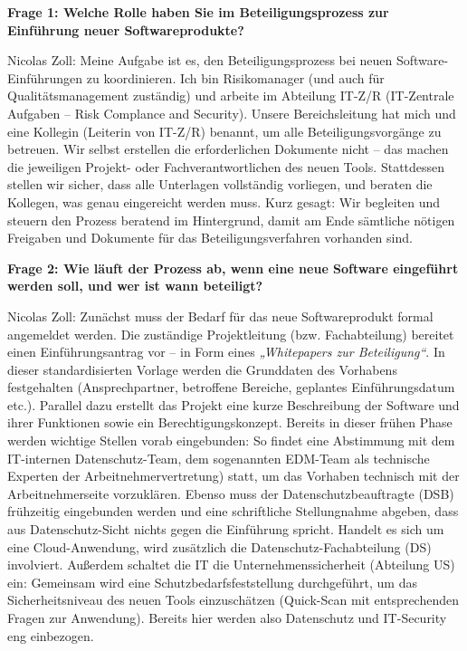 \documentclass[
    12pt, 
    a4paper,
    ]{scrartcl} %
\begin{document}
\textbf{Frage 1: Welche Rolle haben Sie im Beteiligungsprozess zur Einführung neuer Softwareprodukte?}

Nicolas Zoll: Meine Aufgabe ist es, den Beteiligungsprozess bei neuen Software-Einführungen zu koordinieren. Ich bin Risikomanager (und auch für Qualitätsmanagement zuständig) und arbeite im Abteilung IT-Z/R (IT-Zentrale Aufgaben – Risk Complance and Security). Unsere Bereichsleitung hat mich und eine Kollegin (Leiterin von IT-Z/R) benannt, um alle Beteiligungsvorgänge zu betreuen. Wir selbst erstellen die erforderlichen Dokumente nicht – das machen die jeweiligen Projekt- oder Fachverantwortlichen des neuen Tools. Stattdessen stellen wir sicher, dass alle Unterlagen vollständig vorliegen, und beraten die Kollegen, was genau eingereicht werden muss. Kurz gesagt: Wir begleiten und steuern den Prozess beratend im Hintergrund, damit am Ende sämtliche nötigen Freigaben und Dokumente für das Beteiligungsverfahren vorhanden sind.

\textbf{Frage 2: Wie läuft der Prozess ab, wenn eine neue Software eingeführt werden soll, und wer ist wann beteiligt?}

Nicolas Zoll: Zunächst muss der Bedarf für das neue Softwareprodukt formal angemeldet werden. Die zuständige Projektleitung (bzw. Fachabteilung) bereitet einen Einführungsantrag vor – in Form eines \textit{„Whitepapers zur Beteiligung“}. In dieser standardisierten Vorlage werden die Grunddaten des Vorhabens festgehalten (Ansprechpartner, betroffene Bereiche, geplantes Einführungsdatum etc.). Parallel dazu erstellt das Projekt eine kurze Beschreibung der Software und ihrer Funktionen sowie ein Berechtigungskonzept. Bereits in dieser frühen Phase werden wichtige Stellen vorab eingebunden: So findet eine Abstimmung mit dem IT-internen Datenschutz-Team, dem sogenannten EDM-Team als technische Experten der Arbeitnehmervertretung) statt, um das Vorhaben technisch mit der Arbeitnehmerseite vorzuklären. Ebenso muss der Datenschutzbeauftragte (DSB) frühzeitig eingebunden werden und eine schriftliche Stellungnahme abgeben, dass aus Datenschutz-Sicht nichts gegen die Einführung spricht. Handelt es sich um eine Cloud-Anwendung, wird zusätzlich die Datenschutz-Fachabteilung (DS) involviert. Außerdem schaltet die IT die Unternehmenssicherheit (Abteilung US) ein: Gemeinsam wird eine Schutzbedarfsfeststellung durchgeführt, um das Sicherheitsniveau des neuen Tools einzuschätzen (Quick-Scan mit entsprechenden Fragen zur Anwendung). Bereits hier werden also Datenschutz und IT-Security eng einbezogen.
\end{document}
